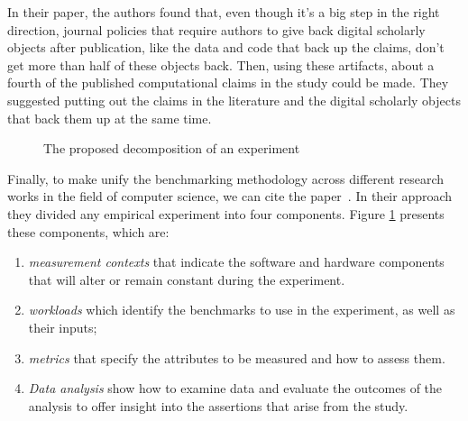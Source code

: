 In their paper\cite{stodden2018empirical}, the authors found that, even though it's a big step in the right direction, journal policies that require authors to give back digital scholarly objects after publication, like the data and code that back up the claims, don't get more than half of these objects back. Then, using these artifacts, about a fourth of the published computational claims in the study could be made. They suggested putting out the claims in the literature and the digital scholarly objects that back them up at the same time.

\begin{figure}[!hbt]
    \caption{The proposed decomposition of an experiment~\cite{stephen_evaluate_2012}}\label{fig:soa_expermiment_component}
\end{figure}
Finally, to make unify the benchmarking methodology across different research works in the field of computer science, we can cite the paper~\cite{stephen_evaluate_2012}. In their approach they  divided any empirical experiment into four  components.
Figure \ref{fig:soa_expermiment_component} presents these components, which are:
\begin{enumerate}
    \item \emph{measurement contexts} that indicate the software and hardware components that will alter or remain constant during the experiment.
    \item \emph{workloads} which identify the benchmarks to use in the experiment, as well as their inputs;
    \item \emph{metrics} that specify the attributes to be measured and how to assess them.
    \item \emph{Data analysis} show how to examine data and evaluate the outcomes of the analysis to offer insight into the assertions that arise from the study.
\end{enumerate}

